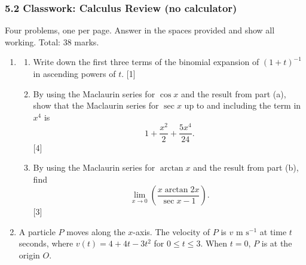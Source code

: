 \documentclass[12pt, twoside]{article}
\begin{document}
\subsubsection*{5.2 Classwork: Calculus Review (no calculator)}

Four problems, one per page. Answer in the spaces provided and show all
working. Total: 38 marks.

\begin{enumerate}[itemsep=0.15cm]

\item[1.] 

\begin{enumerate}[itemsep=0.15cm]
  \item Write down the first three terms of the binomial expansion of
  $(1 + t)^{-1}$ in ascending powers of $t$. \hfill [1]
  \item By using the Maclaurin series for $\cos x$ and the result from
  part (a), show that the Maclaurin series for $\sec x$ up to and
  including the term in $x^{4}$ is
  $$1 + \frac{x^{2}}{2} + \frac{5x^{4}}{24}.$$
  \hfill [4]
  \item By using the Maclaurin series for $\arctan x$ and the result
  from part (b), find
  $$\lim_{x \to 0}\left(\frac{x \arctan 2x}{\sec x - 1}\right).$$
  \hfill [3]
\end{enumerate}


\newpage

\item[2.] 

A particle $P$ moves along the $x$-axis. The velocity of $P$ is
$v \text{ m s}^{-1}$ at time $t$ seconds, where
$v(t) = 4 + 4t - 3t^{2}$ for $0 \leq t \leq 3$. When $t = 0$, $P$ is at
the origin $O$.


\end{enumerate}
\end{document}
